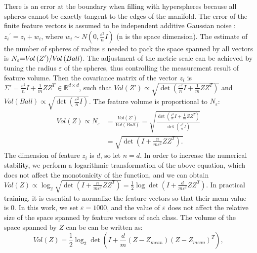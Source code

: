 \documentclass[10pt]{article} %
\begin{document}
There is an error at the boundary when filling with hyperspheres because all spheres cannot be exactly tangent to the edges of the manifold. The error of the finite feature vectors is assumed to be independent additive Gaussian noise \cite{paper26} : ${z_i}^\prime  = {z_i} + {w_i}$, where ${w_i} \sim N( {0,\frac{{{\varepsilon ^2}}}{n}I} )$ (n is the space dimension). The estimate of the number of spheres of radius $\varepsilon$ needed to pack the space spanned by all vectors is ${N_\varepsilon }{\rm{ = }}{{V\!ol\left( {Z'} \right)} \mathord{\left/{\vphantom {{V\!ol\left( {Z'} \right)} {V\!ol\left( w \right)}}} \right.\kern-\nulldelimiterspace} {V\!ol\left( Ball \right)}}$. The adjustment of the metric scale can be achieved by tuning the radius $\varepsilon$ of the spheres, thus controlling the measurement result of feature volume. Then the covariance matrix of the vector ${z_i}$ is $\Sigma ' = \frac{{{\varepsilon ^2}}}{n}I + \frac{1}{m}Z\!{Z^T} \in {\mathbb{R}^{d \times d}}$, such that $V\!ol( {Z'} ) \propto \sqrt {\det ( {\frac{{{\varepsilon ^2}}}{n}I + \frac{1}{m}Z\!{Z^T}} )} $ and $V\!ol( Ball ) \propto \sqrt {\det ( {\frac{{{\varepsilon ^2}}}{n}I} )}$. The feature volume is proportional to ${N_\varepsilon }$:
\begin{equation}
\begin{aligned}
V\!ol\left( Z \right) \propto {N_\varepsilon } &= \frac{{V\!ol\left( {Z'} \right)}}{{V\!ol\left( Ball \right)}} = \sqrt {\frac{{\det \left( {\frac{{{\varepsilon ^2}}}{n}I + \frac{1}{m}Z\!{Z^T}} \right)}}{{\det \left( {\frac{{{\varepsilon ^2}}}{n}I} \right)}}}  \\ 
&= \sqrt {\det \left( {I + \frac{n}{{m{\varepsilon ^2}}}Z\!{Z^T}} \right).} 
\end{aligned}
\end{equation}The dimension of feature ${z_i}$ is $d$, so let $n=d$. In order to increase the numerical stability, we perform a logarithmic transformation of the above equation, which does not affect the monotonicity of the function, and we can obtain $V\!ol\left( Z \right) \propto {\log _2}\sqrt {\det \left( {I + \frac{n}{{m{\varepsilon ^2}}}Z\!{Z^T}} \right)}  = \frac{1}{2}\log \det \left( {I + \frac{d}{{m{\varepsilon ^2}}}Z\!{Z^T}} \right)$. In practical training, it is essential to normalize the feature vectors so that their mean value is $0$. In this work, we set $\varepsilon=1000$, and the value of $\varepsilon$ does not affect the relative size of the space spanned by feature vectors of each class. The volume of the space spanned by $Z$ can be can be written as:
\begin{equation}
V\!ol( Z ) = \frac{1}{2}{\log _2}\det ( {I + \frac{d}{m}( {Z - {Z_{mean}}} ){{( {Z - {Z_{mean}}} )}^T}} ),
\end{equation}
\end{document}
